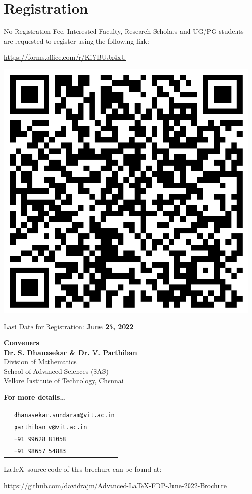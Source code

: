 \section{Registration}
No Registration Fee.
Interested Faculty, Research Scholars and UG/PG students are requested to register using the following link:

\begin{center}
	\textcolor{Maroon}{
		\large 
		\url{https://forms.office.com/r/KiYBUJx4xU}
	}
	
	\includegraphics[width=.35\textwidth]{img/qr}
\end{center}



Last Date for Registration: \textcolor{primaryColor}{\large \textbf{June 25, 2022}}

\begin{center}
	\textcolor{primaryColor}{\Large \textbf{Conveners}}\\[.5\baselineskip]
	\textbf{\textcolor{secondaryColor}{Dr. S. Dhanasekar \& Dr. V. Parthiban}}\\
	Division of Mathematics\\
	School of Advanced Sciences (SAS)\\
	Vellore Institute of Technology, Chennai
\end{center}

\begin{snugshade}
\vspace{0.5\baselineskip}
		\begin{center}
\textcolor{primaryColor}{\Large \textbf{For more details\dots}}\\[.5\baselineskip]
		\begin{tabular}{cp{}}
			\textcolor{primaryColor}{\faEnvelope} & \texttt{dhanasekar.sundaram@vit.ac.in} \\
			& \texttt{parthiban.v@vit.ac.in} \\
			\textcolor{primaryColor}{\faPhone} & \texttt{+91 99628 81058}\\
			& \texttt{+91 98657 54883}
		\end{tabular}
	\end{center}
\end{snugshade}

\vfill

\begin{footnotesize}
\LaTeX\ source code of this brochure can be found at:

\url{https://github.com/davidrajm/Advanced-LaTeX-FDP-June-2022-Brochure}
\end{footnotesize}



